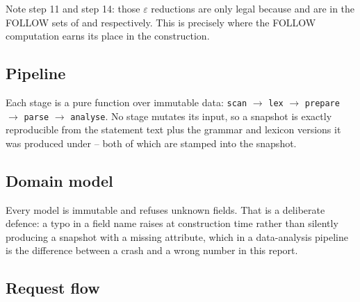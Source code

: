 Note step 11 and step 14: those $\varepsilon$ reductions are only legal because 
and  are in the FOLLOW sets of  and 
respectively. This is precisely where the FOLLOW computation earns its place in the
construction.

\subsection{Pipeline}


Each stage is a pure function over immutable data: \texttt{scan} $\rightarrow$
\texttt{lex} $\rightarrow$ \texttt{prepare} $\rightarrow$ \texttt{parse} $\rightarrow$
\texttt{analyse}. No stage mutates its input, so a snapshot is exactly reproducible from
the statement text plus the grammar and lexicon versions it was produced under -- both of
which are stamped into the snapshot.

\subsection{Domain model}


Every model is immutable and refuses unknown fields. That is a deliberate defence: a typo
in a field name raises at construction time rather than silently producing a snapshot with
a missing attribute, which in a data-analysis pipeline is the difference between a crash
and a wrong number in this report.

\subsection{Request flow}

